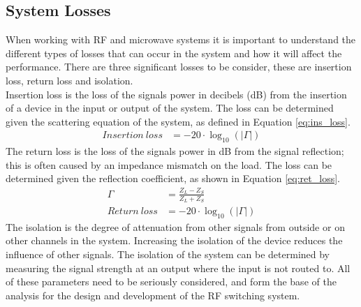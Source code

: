 \documentclass[12pt,openany,a4paper]{book}
\begin{document}
\subsection{System Losses}
When working with RF and microwave systems it is important to understand the different types of losses that can occur in the system and how it will affect the performance. There are three significant losses to be consider, these are insertion loss, return loss and isolation.\\
Insertion loss is the loss of the signals power in decibels (dB) from the insertion of a device in the input or output of the system. The loss can be determined given the scattering equation of the system, as defined in Equation \ref{eq:ins_loss}.
\begin{align}
Insertion \ loss &= -20\cdot \log_{10}\left( |\Gamma | \right) \label{eq:ins_loss}
\end{align}
The return loss is the loss of the signals power in dB from the signal reflection; this is often caused by an impedance mismatch on the load. The loss can be determined given the reflection coefficient, as shown in Equation \ref{eq:ret_loss}.
\begin{align}
\Gamma &= \frac{Z_L-Z_S}{Z_L+Z_S} \label{eq:ref} \\
Return \ loss &= -20\cdot \log_{10}\left( |\Gamma | \right) \label{eq:ret_loss}
\end{align}
The isolation is the degree of attenuation from other signals from outside or on other channels in the system. Increasing the isolation of the device reduces the influence of other signals. The isolation of the system can be determined by measuring the signal strength at an output where the input is not routed to. \cite{ref9} All of these parameters need to be seriously considered, and form the base of the analysis for the design and development of the RF switching system.

\end{document}
